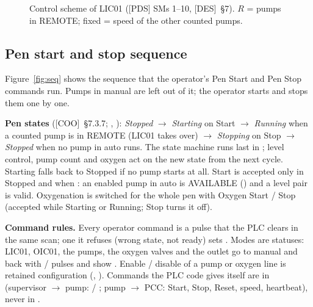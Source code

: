 \documentclass[11pt,a4paper]{article}
\begin{document}
\begin{figure}[htbp]
{}
\caption{Control scheme of LIC01 ([PDS] SMs 1--10, [DES]~\S7). $R$ = pumps in REMOTE; fixed = speed of the other counted pumps.}
\label{fig:lic}
\end{figure}

\subsection{Pen start and stop sequence}
\label{sec:seq}
Figure~\ref{fig:seq} shows the sequence that the operator's Pen Start and Pen Stop commands run.
Pumps in manual are left out of it; the operator starts and stops them one by one.

\textbf{Pen states} ([COO]~\S7.3.7; , ): \emph{Stopped}
$\to$ \emph{Starting} on Start $\to$ \emph{Running} when a counted pump is in REMOTE (LIC01 takes over)
$\to$ \emph{Stopping} on Stop $\to$ \emph{Stopped} when no pump in auto runs. The state machine runs last in
; level control, pump count and oxygen act on the new state from the next cycle. Starting falls back to Stopped if no pump starts at all.
Start is accepted only in Stopped and when : an enabled pump in auto is AVAILABLE
() and a level pair is valid. Oxygenation is switched for the whole pen with Oxygen Start /
Stop (accepted while Starting or Running; Stop turns it off).

\textbf{Command rules.} Every operator command is a pulse that the PLC clears in the same scan; one it
refuses (wrong state, not ready) sets . Modes are statuses: LIC01, OIC01,
the pumps, the oxygen valves and the outlet go to manual and back with  /
 pulses and show . Enable / disable of a pump or oxygen line is
retained configuration (, ). Commands the
PLC code gives itself are in  (supervisor $\to$ pump:  /
; pump $\to$ PCC: Start, Stop, Reset, speed, heartbeat), never in .
\end{document}
